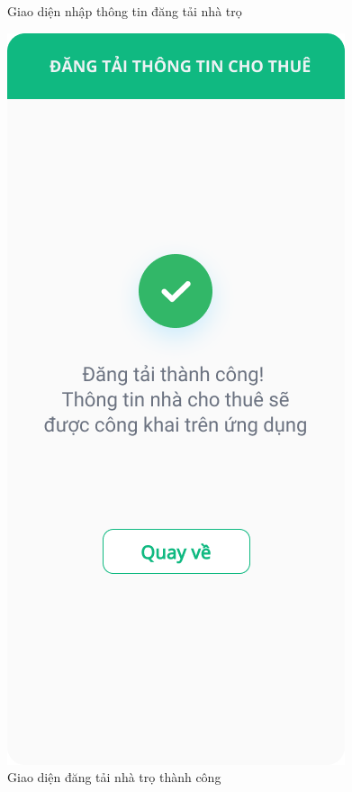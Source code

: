 \begin{figure}[!htb]
\begin{minipage}{0.32\textwidth}
     \caption{Giao diện nhập thông tin đăng tải nhà trọ}
   \end{minipage}\hfill
   \begin{minipage}{0.32\textwidth}
     \centering
     \includegraphics[width=1\linewidth]{Images/UI figma/Upload Rooming House 3.png}
     \caption{Giao diện đăng tải nhà trọ thành công}
   \end{minipage}
\end{figure}
\newpage
